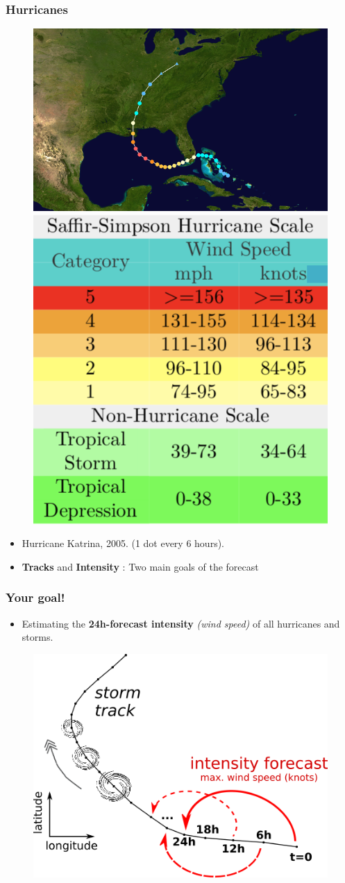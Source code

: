 \documentclass[handout]{beamer}
\begin{document}
\begin{frame}
\frametitle{Hurricanes}

\begin{figure}
	\includegraphics[width=0.6\linewidth, height=0.6\textheight]{fig/L1/Katrina.png}
	\includegraphics[width=0.3\linewidth, height=0.4\textheight]{fig/L1/saffir-simpson.png}
\end{figure}
\begin{itemize}
\item Hurricane Katrina, 2005. (1 dot every 6 hours).\\
\item \textbf{Tracks} and \textbf{Intensity} : Two main goals of the forecast
\end{itemize}
\end{frame}


\begin{frame}
\frametitle{Your goal!}
\begin{itemize}
	\item Estimating the \textbf{24h-forecast intensity} \textit{(wind speed)} of all hurricanes and storms.  \\
\end{itemize}
\begin{figure}
	\includegraphics[width=0.6\linewidth]{fig/L1/goal.png}
\end{figure}
\end{frame}
\end{document}
